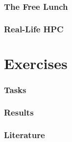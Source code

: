 \documentclass[9pt,xcolor=table]{beamer}
\begin{document}
\section{The Free Lunch}
\section{Real-Life HPC}


\part{Exercises}
\section{Tasks}
\section{Results}

\section{Literature}
\begin{frame}[c]
\frametitle{\insertsection{}}
\nocite{*}
\tiny%


\end{frame}
\end{document}
